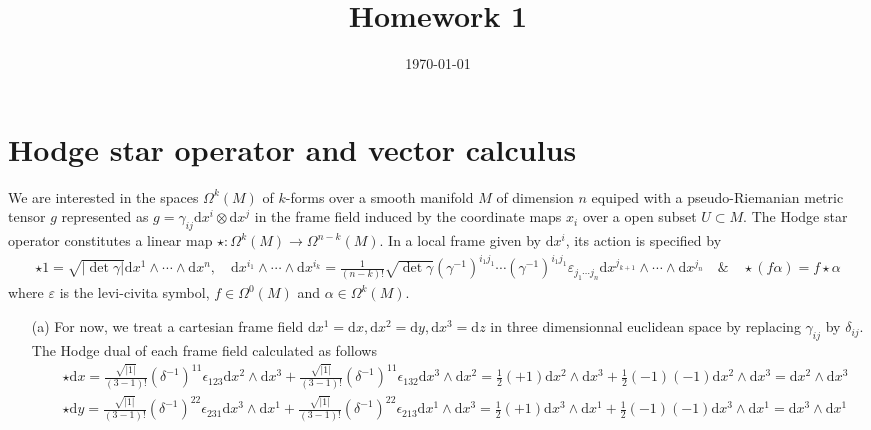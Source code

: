 \documentclass[10pt, a4paper]{article}
\title{Homework 1} %
\author{\PA} %
\date{\today} %
\begin{document}
\maketitlepage

\maketableofcontents


\footnotesize{

\section{Hodge star operator and vector calculus}
We are interested in the spaces $\Omega^k(M)$ of $k$-forms over a smooth manifold $M$ of dimension $n$ equiped with a pseudo-Riemanian metric tensor $g$ represented as $g = \gamma_{ij} \text{d}x^i \otimes \text{d}x^j$ in the frame field induced by the coordinate maps $x_i$ over a open subset $U \subset M$. The Hodge star operator constitutes a linear map $\star : \Omega^k(M) \to \Omega^{n-k}(M)$. In a local frame given by $\text{d}x^i$, its action is specified by 
\begin{align*}
  \star 1 = \sqrt{|\det{\gamma}|} \text{d}x^1 \wedge \cdots \wedge \text{d}x^n, \quad \text{d}x^{i_{1}} \wedge \cdots \wedge \text{d}x^{i_k} = \frac{1}{(n-k)!} \sqrt{\det \gamma} (\gamma^{-1})^{i_1 j_1}  \cdots (\gamma^{-1})^{i_1 j_1} \varepsilon_{j_1 \cdots j_n}  \text{d}x^{j_{k+1}} \wedge \cdots \wedge \text{d}x^{j_n} \quad \& \quad \star (f \alpha) = f \star \alpha  
\end{align*}
where $\varepsilon$ is the levi-civita symbol, $f\in \Omega^0(M)$ and $\alpha \in \Omega^k(M)$.
\begin{enumerate}
  \item[(a)] For now, we treat a cartesian frame field $\text{d}x^1 = \text{d}x, \text{d}x^2 = \text{d}y, \text{d}x^3 = \text{d}z$ in three dimensionnal euclidean space by replacing $\gamma_{ij}$ by $\delta_{ij}$. The Hodge dual of each frame field calculated as follows 
  \begin{align*}
    &\star \text{d}x = \frac{\sqrt{|1|}}{(3-1)!}(\delta^{-1})^{11}\epsilon_{123} \text{d}x^2 \wedge \text{d}x^3 + \frac{\sqrt{|1|}}{(3-1)!}(\delta^{-1})^{11}\epsilon_{132} \text{d}x^3 \wedge \text{d}x^2 = \frac{1}{2}(+1) \text{d}x^2 \wedge \text{d}x^3 + \frac{1}{2} (-1)(-1) \text{d}x^2 \wedge \text{d}x^3 = \text{d}x^2 \wedge \text{d}x^3\\
    &\star \text{d}y = \frac{\sqrt{|1|}}{(3-1)!}(\delta^{-1})^{22}\epsilon_{231} \text{d}x^3 \wedge \text{d}x^1 + \frac{\sqrt{|1|}}{(3-1)!}(\delta^{-1})^{22}\epsilon_{213} \text{d}x^1 \wedge \text{d}x^3 = \frac{1}{2}(+1) \text{d}x^3 \wedge \text{d}x^1 + \frac{1}{2} (-1)(-1) \text{d}x^3 \wedge \text{d}x^1 = \text{d}x^3 \wedge \text{d}x^1\\

\end{align*}
\end{enumerate}}
\end{document}
